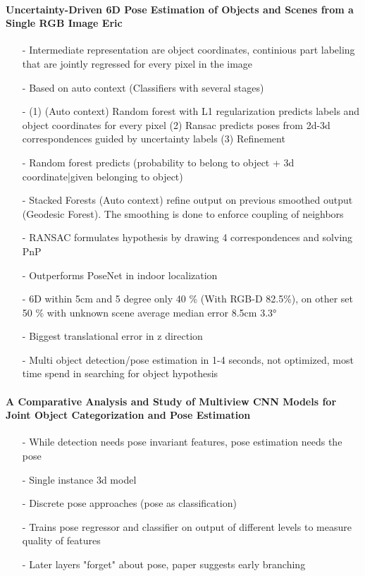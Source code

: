 	\paragraph{Uncertainty-Driven 6D Pose Estimation of Objects and Scenes from a Single RGB Image
		Eric \cite{Brachmann}}
	\begin{itemize}
		\item[-] Intermediate representation are object coordinates, continious part labeling that are jointly regressed for every pixel in the image
		\item[-] Based on auto context (Classifiers with several stages)
		\item[-] (1) (Auto context) Random forest with L1 regularization predicts labels and object coordinates for every pixel (2) Ransac predicts poses from 2d-3d correspondences guided by uncertainty labels
		(3) Refinement
		\item[-] Random forest predicts (probability to belong to object + 3d coordinate|given belonging to object)
		\item[-] Stacked Forests (Auto context) refine output on previous smoothed output (Geodesic Forest). The smoothing is done to enforce coupling of neighbors 
		\item[-] RANSAC formulates hypothesis by drawing 4 correspondences and solving PnP
		\item[-] Outperforms PoseNet in indoor localization
		\item[-] 6D within 5cm and 5 degree only 40 \% (With RGB-D 82.5\%), on other set 50 \% with unknown scene average median error 8.5cm 3.3°
		\item[-] Biggest translational error in z direction
		\item[-] Multi object detection/pose estimation in 1-4 seconds, not optimized, most time spend in searching for object hypothesis
	\end{itemize}
	\paragraph{A Comparative Analysis and Study of Multiview CNN Models for Joint Object Categorization and Pose Estimation\cite{Elhoseiny}}
	\begin{itemize}
		\item[-] While detection needs pose invariant features, pose estimation needs the pose
		\item[-] Single instance 3d model
		\item[-] Discrete pose approaches (pose as classification)
		\item[-] Trains pose regressor and classifier on output of different levels to measure quality of features
		\item[-] Later layers "forget" about pose, paper suggests early branching
	\end{itemize}
